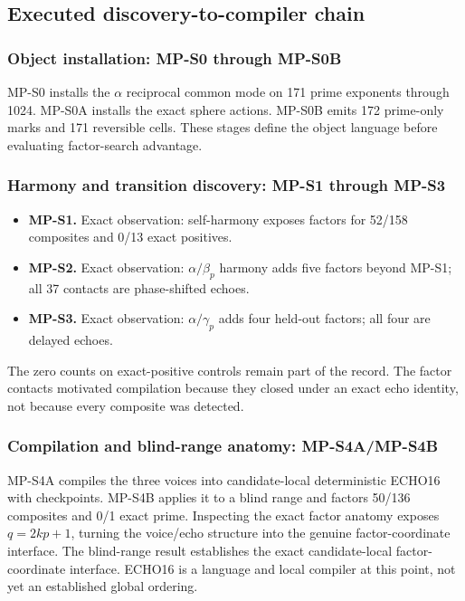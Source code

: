 \subsection{Executed discovery-to-compiler
chain}\label{viii-ch10-executed-discovery-to-compiler-chain}

\subsubsection{Object installation: MP-S0 through
MP-S0B}\label{viii-ch10-object-installation-mp-s0-through-mp-s0b}

MP-S0 installs the \(\alpha\) reciprocal common mode on 171 prime
exponents through 1024. MP-S0A installs the exact sphere actions. MP-S0B
emits 172 prime-only marks and 171 reversible cells. These stages define
the object language before evaluating factor-search advantage.

\subsubsection{Harmony and transition discovery: MP-S1 through
MP-S3}\label{viii-ch10-harmony-and-transition-discovery-mp-s1-through-mp-s3}

\begin{itemize}
\tightlist
\item
  \textbf{MP-S1.} Exact observation: self-harmony exposes factors for
  52/158 composites and 0/13 exact positives.
\item
  \textbf{MP-S2.} Exact observation: \(\alpha/\beta_p\) harmony adds
  five factors beyond MP-S1; all 37 contacts are phase-shifted echoes.
\item
  \textbf{MP-S3.} Exact observation: \(\alpha/\gamma_p\) adds four
  held-out factors; all four are delayed echoes.
\end{itemize}

The zero counts on exact-positive controls remain part of the record.
The factor contacts motivated compilation because they closed under an
exact echo identity, not because every composite was detected.

\subsubsection{Compilation and blind-range anatomy:
MP-S4A/MP-S4B}\label{viii-ch10-compilation-and-blind-range-anatomy-mp-s4amp-s4b}

MP-S4A compiles the three voices into candidate-local deterministic
ECHO16 with checkpoints. MP-S4B applies it to a blind range and factors
50/136 composites and 0/1 exact prime. Inspecting the exact factor
anatomy exposes \(q=2kp+1\), turning the voice/echo structure into the
genuine factor-coordinate interface. The blind-range result establishes the exact candidate-local factor-coordinate interface. ECHO16 is a
language and local compiler at this point, not yet an established global
ordering.

